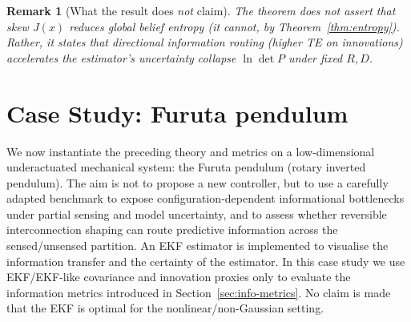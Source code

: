 \documentclass[final,5p,times,twocolumn]{elsarticle}
\newtheorem{remark}{Remark}
\begin{document}
\begin{remark}[What the result does \emph{not} claim]
	The theorem does not assert that skew \(J(x)\) reduces global belief entropy (it cannot, by Theorem~\ref{thm:entropy}). Rather, it states that \emph{directional} information routing (higher TE on innovations) accelerates the estimator’s uncertainty collapse \(\ln\det P\) under fixed \(R,D\).
\end{remark}

\section{Case Study: Furuta pendulum}
\label{sec:case-furuta}

We now instantiate the preceding theory and metrics on a low-dimensional underactuated mechanical system: the Furuta pendulum (rotary inverted pendulum). The aim is not to propose a new controller, but to use a carefully adapted benchmark to expose configuration-dependent informational bottlenecks under partial sensing and model uncertainty, and to assess whether reversible interconnection shaping can route predictive information across the sensed/unsensed partition. An EKF estimator is implemented to visualise the information transfer and the certainty of the estimator. In this case study we use EKF/EKF-like covariance and innovation proxies only to evaluate the information metrics introduced in Section~\ref{sec:info-metrics}. No claim is made that the EKF is optimal for the nonlinear/non-Gaussian setting.
\end{document}
